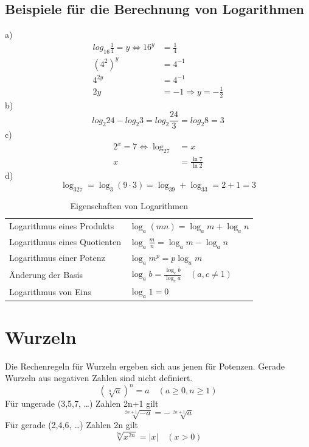 \documentclass[a4paper]{article}
\begin{document}
\subsection{Beispiele für die Berechnung von Logarithmen}
a) 
\begin{align*}
log_{16}\frac{1}{4} = y \Leftrightarrow 16^y&=\frac{1}{4} \\
{(4^2)}^y&=4^{-1} \\
4^{2y}&=4^{-1} \\
2y&=-1 \Rightarrow y=-\frac{1}{2}
\end{align*}
b) 
\[
log_2 24 - log_2 3 = log_2 {\frac{24}{3}} =log_2 8= 3
\]
c)
\begin{align*}
2^x=7 \Leftrightarrow \log_27 &= x \\
x &= \frac{\ln7}{\ln2}
\end{align*}
d) \[\log_327=\log_3{(9\cdot3)}=\log_39+\log_33=2+1=3 \]

\begin{table}[t]
\renewcommand*{\arraystretch}{1.4}
\centering
\begin{tabular}{l l} \hline
Logarithmus eines Produkts & $\log_a (mn) = \log_a m + \log_a n$ \\
Logarithmus eines Quotienten & $\log_a \frac{m}{n}  = \log_a m - \log_a n$ \\
Logarithmus einer Potenz  & $\log_a m^p = p \log_a m$ \\
\hline
Änderung der Basis & $\log_a b = \frac{\log_c b}{\log_c a} \quad(a,c \neq 1)$ \\
Logarithmus von Eins & $\log_a 1 = 0$ \\
\end{tabular}
\caption{\label{tab:Logarithmen}{Eigenschaften von Logarithmen}}
\end{table}

\section{Wurzeln}
Die Rechenregeln für Wurzeln ergeben sich aus jenen für Potenzen. Gerade Wurzeln aus negativen Zahlen sind nicht definiert.
\[ (\sqrt[n] a)^n =a \quad (a\geq0,n\geq 1) \]
Für ungerade (3,5,7, \ldots) Zahlen 2n+1 gilt
\[ \sqrt[2n+1]{-a} = -\sqrt[2n+1]{a} \]
Für gerade (2,4,6, \ldots) Zahlen 2n gilt
\[ \sqrt[2n]{x^{2n}} = |x| \quad (x > 0) \]
\end{document}
